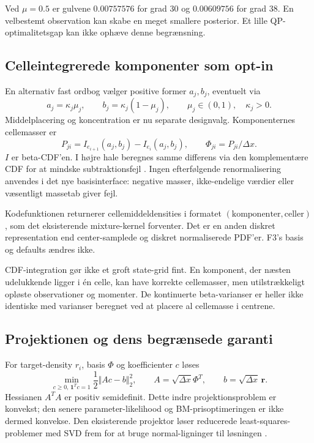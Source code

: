 Ved \(\mu=0.5\) er gulvene \(0.00757576\) for grad 30 og \(0.00609756\) for grad 38. En velbestemt observation kan skabe en meget smallere posterior. Et lille QP-optimalitetsgap kan ikke ophæve denne begrænsning.

\subsection{Celleintegrerede komponenter som opt-in}
En alternativ fast ordbog vælger positive former \(a_j,b_j\), eventuelt via
\begin{equation}
 a_j=\kappa_j\mu_j,\qquad b_j=\kappa_j(1-\mu_j),\qquad
 \mu_j\in(0,1),\quad\kappa_j>0.
 \label{eq:betadictionary}
\end{equation}
Middelplacering og koncentration er nu separate designvalg. Komponenternes cellemasser er
\begin{equation}
 P_{ji}=I_{e_{i+1}}(a_j,b_j)-I_{e_i}(a_j,b_j),\qquad
 \Phi_{ji}=P_{ji}/\Delta x.
 \label{eq:integratedbasis}
\end{equation}
\(I\) er beta-CDF'en. I højre hale beregnes samme differens via den komplementære CDF for at mindske subtraktionsfejl \cite{scipybeta}. Ingen efterfølgende renormalisering anvendes i det nye basisinterface: negative masser, ikke-endelige værdier eller væsentligt massetab giver fejl.

Kodefunktionen returnerer cellemiddeldensities i formatet \((\text{komponenter},\text{celler})\), som det eksisterende mixture-kernel forventer. Det er en anden diskret representation end center-samplede og diskret normaliserede PDF'er. F3's basis og defaults ændres ikke.

CDF-integration gør ikke et groft state-grid fint. En komponent, der næsten udelukkende ligger i én celle, kan have korrekte cellemasser, men utilstrækkeligt opløste observationer og momenter. De kontinuerte beta-varianser er heller ikke identiske med varianser beregnet ved at placere al cellemasse i centrene.

\subsection{Projektionen og dens begrænsede garanti}
For target-density \(r_i\), basis \(\Phi\) og koefficienter \(c\) løses
\begin{equation}
 \min_{c\geq0,\,\bm1^Tc=1}\frac12\Vert Ac-b\Vert_2^2,
 \qquad A=\sqrt{\Delta x}\Phi^T,\qquad b=\sqrt{\Delta x}\,\bm r.
 \label{eq:projection}
\end{equation}
Hessianen \(A^TA\) er positiv semidefinit. Dette indre projektionsproblem er konvekst; den senere parameter-likelihood og BM-prisoptimeringen er ikke dermed konvekse. Den eksisterende projektor løser reducerede least-squares-problemer med SVD frem for at bruge normal-ligninger til løsningen \cite{repo,nielsen}.

